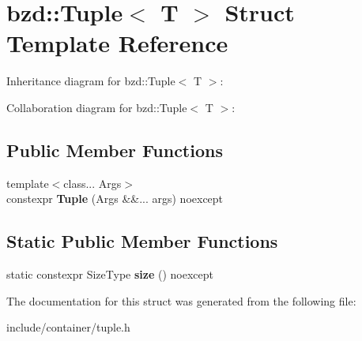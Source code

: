 \hypertarget{structbzd_1_1Tuple}{}\section{bzd\+:\+:Tuple$<$ T $>$ Struct Template Reference}
\label{structbzd_1_1Tuple}


Inheritance diagram for bzd\+:\+:Tuple$<$ T $>$\+:


Collaboration diagram for bzd\+:\+:Tuple$<$ T $>$\+:
\subsection*{Public Member Functions}
\begin{DoxyCompactItemize}
\item 
\mbox{\label{structbzd_1_1Tuple_ac5db22ef1870a4a1c72350194b710707}} 
{\footnotesize template$<$class... Args$>$ }\\constexpr {\bfseries Tuple} (Args \&\&... args) noexcept
\end{DoxyCompactItemize}
\subsection*{Static Public Member Functions}
\begin{DoxyCompactItemize}
\item 
\mbox{\label{structbzd_1_1Tuple_ae9be36d3beeba2c41df98f61e5f024ee}} 
static constexpr Size\+Type {\bfseries size} () noexcept
\end{DoxyCompactItemize}


The documentation for this struct was generated from the following file\+:\begin{DoxyCompactItemize}
\item 
include/container/tuple.\+h\end{DoxyCompactItemize}
